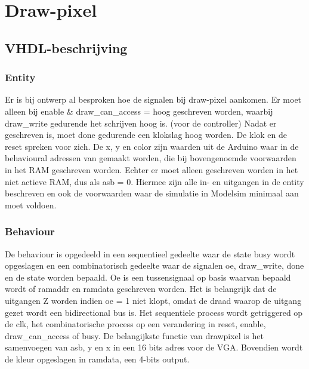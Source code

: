 \documentclass{scrreprt} %
\date{22 november 2013}
\begin{document}
\section{Draw-pixel}

\subsection{VHDL-beschrijving}
\subsubsection{Entity}
Er is bij ontwerp al besproken hoe de signalen bij draw-pixel aankomen. Er moet alleen bij enable \& draw\_can\_access = hoog geschreven worden, waarbij draw\_write gedurende het schrijven hoog is. (voor de controller)  Nadat er geschreven is, moet done gedurende een klokslag hoog worden. De klok en de reset spreken voor zich. De x, y en color zijn waarden uit de Arduino waar in de behavioural adressen van gemaakt worden, die bij bovengenoemde voorwaarden in het RAM geschreven worden. Echter er moet alleen geschreven worden in het niet actieve RAM, dus als asb = 0.  Hiermee zijn alle in- en uitgangen in de entity beschreven en ook de voorwaarden waar de simulatie in Modelsim minimaal aan moet voldoen. 

\subsubsection{Behaviour}
De behaviour is opgedeeld in een sequentieel gedeelte waar de state busy wordt opgeslagen en een combinatorisch gedeelte waar de signalen oe, draw\_write, done en de state worden bepaald. Oe is een tussensignaal op basis waarvan bepaald wordt of ramaddr en ramdata geschreven worden. Het is belangrijk dat de uitgangen Z worden indien oe = 1 niet klopt, omdat de draad waarop de uitgang gezet wordt een bidirectional bus is. Het sequentiele process wordt getriggered op de clk, het combinatorische process op een verandering in reset, enable, draw\_can\_access of busy. De belangijkste functie
van drawpixel is het samenvoegen van asb, y en x in een 16 bits adres voor de VGA. Bovendien wordt de kleur opgeslagen in ramdata, een 4-bits output. 
\end{document}
